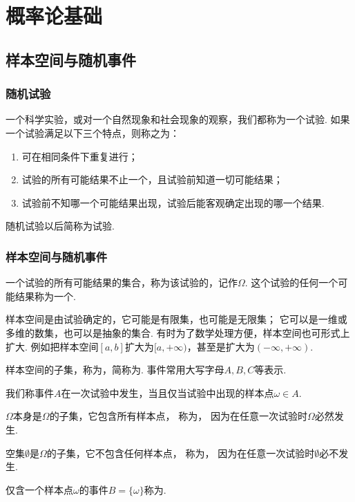 \chapter{概率论基础}
\section{样本空间与随机事件}
\subsection{随机试验}
\begin{definition}
一个科学实验，或对一个自然现象和社会现象的观察，我们都称为一个试验.
如果一个试验满足以下三个特点，则称之为：
\begin{enumerate}
	\item 可在相同条件下重复进行；
	\item 试验的所有可能结果不止一个，且试验前知道一切可能结果；
	\item 试验前不知哪一个可能结果出现，试验后能客观确定出现的哪一个结果.
\end{enumerate}
\end{definition}
随机试验以后简称为试验.

\subsection{样本空间与随机事件}
\begin{definition}
一个试验的所有可能结果的集合，称为该试验的，记作\(\Omega\).
这个试验的任何一个可能结果称为一个.
\end{definition}

样本空间是由试验确定的，它可能是有限集，也可能是无限集；
它可以是一维或多维的数集，也可以是抽象的集合.
有时为了数学处理方便，样本空间也可形式上扩大.
例如把样本空间\([a,b]\)扩大为\([a,+\infty)\)，甚至是扩大为\((-\infty,+\infty)\).

\begin{definition}
样本空间的子集，称为，简称为.
事件常用大写字母\(A,B,C\)等表示.

我们称事件\(A\)在一次试验中发生，当且仅当试验中出现的样本点\(\omega \in A\).
\end{definition}

\begin{definition}
\(\Omega\)本身是\(\Omega\)的子集，它包含所有样本点，
称为，
因为在任意一次试验时\(\Omega\)必然发生.

空集\(\emptyset\)是\(\Omega\)的子集，它不包含任何样本点，
称为，
因为在任意一次试验时\(\emptyset\)必不发生.

仅含一个样本点\(\omega\)的事件\(B = \{\omega\}\)称为.
\end{definition}

